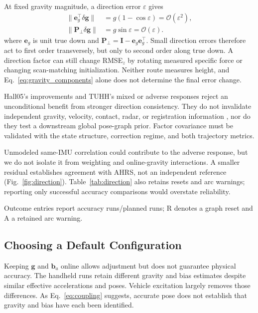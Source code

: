 At fixed gravity magnitude, a direction error $\varepsilon$ gives
\begin{equation}
 \begin{aligned}
  \|\mathbf e_g^\top\delta\mathbf g\|
    &=g(1-\cos\varepsilon)=\mathcal O(\varepsilon^2),\\
  \|\mathbf P_{\perp}\delta\mathbf g\|
    &=g\sin\varepsilon=\mathcal O(\varepsilon).
 \end{aligned}
\label{eq:gravity_components}
\end{equation}
where $\mathbf e_g$ is unit true down and
$\mathbf P_\perp=\mathbf I-\mathbf e_g\mathbf e_g^\top$.
Small direction errors therefore act to first order transversely, but only to
second order along true down. A direction factor can still change RMSE$_z$ by
rotating measured specific force or changing scan-matching initialization.
Neither route measures height, and Eq.~\ref{eq:gravity_components} alone does
not determine the final error change.

Hall05's improvements and TUHH's mixed or adverse responses reject an
unconditional benefit from stronger direction consistency. They do not
invalidate independent gravity, velocity, contact, radar, or registration
information
\cite{kubelka2022gravity,noh2025garlio,noh2025garlileo}, nor do they test a
downstream global pose-graph prior. Factor covariance must be validated with
the state structure, correction regime, and both trajectory metrics.

Unmodeled same-IMU correlation could contribute to the adverse response, but
we do not isolate it from weighting and online-gravity interactions.
A smaller residual establishes agreement with AHRS, not an independent
reference (Fig.~\ref{fig:direction}). Table~\ref{tab:direction} also retains
resets and arc warnings; reporting only successful accuracy comparisons would
overstate reliability.

\begin{table}[t]
\caption{Direction-factor effects relative to factor-off.}
\label{tab:direction}
\centering
\footnotesize
\setlength{\tabcolsep}{2.0pt}

\vspace{1pt}
{\scriptsize\raggedright Outcome entries report accuracy runs/planned runs;
R denotes a graph reset and A a retained arc warning.\par}
\end{table}

\subsection{Choosing a Default Configuration}
Keeping $\mathbf g$ and $\mathbf b_a$ online allows adjustment but does not
guarantee physical accuracy. The handheld runs retain different gravity and
bias estimates despite similar effective accelerations and poses. Vehicle
excitation largely removes those differences. As Eq.~\ref{eq:coupling}
suggests, accurate pose does not establish that gravity and bias have each
been identified.

